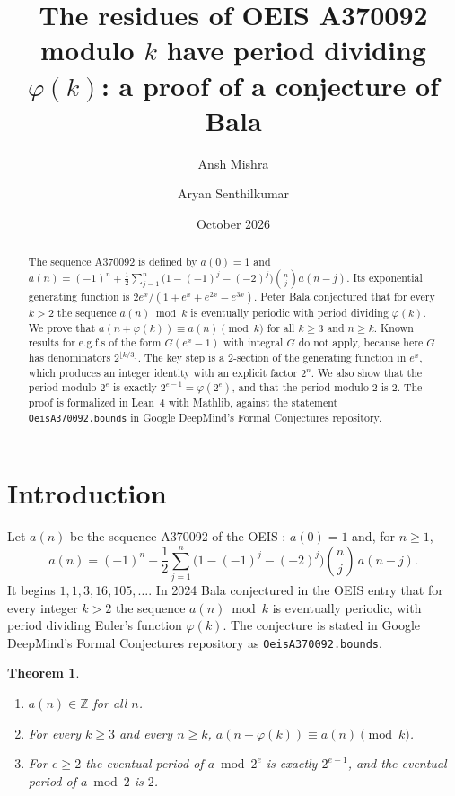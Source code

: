\documentclass[11pt]{amsart}
\newtheorem{theorem}{Theorem}
\theoremstyle{remark}
\newcommand{\Z}{\mathbb{Z}}
\newcommand{\lean}[1]{\texttt{#1}}
\begin{document}
\title[Bala's conjecture for A370092]{The residues of OEIS A370092 modulo $k$ have period dividing $\varphi(k)$: a proof of a conjecture of Bala}

\author{Ansh Mishra}
\author{Aryan Senthilkumar}

\date{October 2026}

\begin{abstract}
The sequence A370092 is defined by $a(0)=1$ and $a(n)=(-1)^n+\frac12\sum_{j=1}^{n}\bigl(1-(-1)^j-(-2)^j\bigr)\binom nj a(n-j)$.
Its exponential generating function is $2e^x/(1+e^x+e^{2x}-e^{3x})$.
Peter Bala conjectured that for every $k>2$ the sequence $a(n)\bmod k$ is eventually periodic with period dividing $\varphi(k)$.
We prove that $a(n+\varphi(k))\equiv a(n)\pmod k$ for all $k\ge3$ and $n\ge k$.
Known results for e.g.f.s of the form $G(e^x-1)$ with integral $G$ do not apply, because here $G$ has denominators $2^{\lfloor k/3\rfloor}$.
The key step is a $2$-section of the generating function in $e^x$, which produces an integer identity with an explicit factor $2^n$.
We also show that the period modulo $2^e$ is exactly $2^{e-1}=\varphi(2^e)$, and that the period modulo $2$ is $2$.
The proof is formalized in Lean~4 with Mathlib, against the statement \lean{OeisA370092.bounds} in Google DeepMind's Formal Conjectures repository.
\end{abstract}

\maketitle

\section{Introduction}

Let $a(n)$ be the sequence A370092 of the OEIS \cite{OEIS}: $a(0)=1$ and, for $n\ge1$,
\begin{equation}\label{eq:rec}
a(n)=(-1)^n+\frac12\sum_{j=1}^{n}\bigl(1-(-1)^j-(-2)^j\bigr)\binom nj\,a(n-j).
\end{equation}
It begins $1,1,3,16,105,\dots$.
In 2024 Bala conjectured in the OEIS entry that for every integer $k>2$ the sequence $a(n)\bmod k$ is eventually periodic, with period dividing Euler's function $\varphi(k)$.
The conjecture is stated in Google DeepMind's Formal Conjectures repository \cite{FC} as \lean{OeisA370092.bounds}.

\begin{theorem}\label{thm:main}
\begin{enumerate}
\item[(i)] $a(n)\in\Z$ for all $n$.
\item[(ii)] For every $k\ge3$ and every $n\ge k$, $a(n+\varphi(k))\equiv a(n)\pmod k$.
\item[(iii)] For $e\ge2$ the eventual period of $a\bmod 2^e$ is exactly $2^{e-1}$, and the eventual period of $a\bmod2$ is $2$.
\end{enumerate}
\end{theorem}
\end{document}
